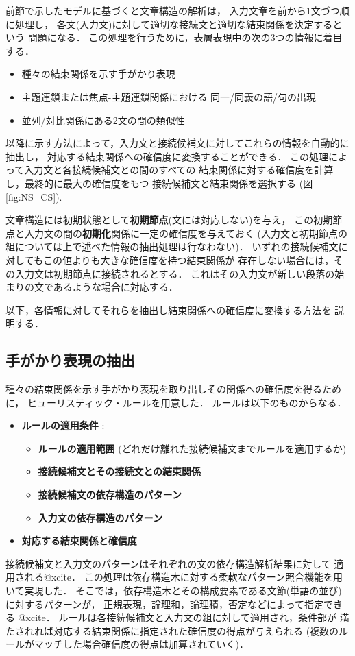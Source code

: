 前節で示したモデルに基づくと文章構造の解析は，
入力文章を前から1文づつ順に処理し，
各文(入力文)に対して適切な接続文と適切な結束関係を決定するという
問題になる．
この処理を行うために，表層表現中の次の3つの情報に着目する．
\begin{itemize}
  \item 種々の結束関係を示す手がかり表現
  \item 主題連鎖または焦点-主題連鎖関係における
同一/同義の語/句の出現
  \item 並列/対比関係にある2文の間の類似性
\end{itemize}
以降に示す方法によって，入力文と接続候補文に対してこれらの情報を自動的に抽出し，
対応する結束関係への確信度に変換することができる．
この処理によって入力文と各接続候補文との間のすべての
結束関係に対する確信度を計算し，最終的に最大の確信度をもつ
接続候補文と結束関係を選択する
(図[fig:NS_CS]). 

文章構造には初期状態として{\bf 初期節点}(文には対応しない)を与え，
この初期節点と入力文の間の{\bf 初期化}関係に一定の確信度を与えておく
(入力文と初期節点の組については上で述べた情報の抽出処理は行なわない)．
いずれの接続候補文に対してもこの値よりも大きな確信度を持つ結束関係が
存在しない場合には，その入力文は初期節点に接続されるとする．
これはその入力文が新しい段落の始まりの文であるような場合に対応する．

以下，各情報に対してそれらを抽出し結束関係への確信度に変換する方法を
説明する．

{\unitlength=1mm

}

\subsection{手がかり表現の抽出}

種々の結束関係を示す手がかり表現を取り出しその関係への確信度を得るために，
ヒューリスティック・ルールを用意した．
ルールは以下のものからなる．
\begin{itemize}
\item {\bf ルールの適用条件} :
  \begin{itemize}
  \item {\bf ルールの適用範囲} 
    (どれだけ離れた接続候補文までルールを適用するか)
  \item {\bf 接続候補文とその接続文との結束関係}

  \item {\bf 接続候補文の依存構造のパターン}
  \item {\bf 入力文の依存構造のパターン}
  \end{itemize}
\item {\bf 対応する結束関係と確信度}
\end{itemize}
接続候補文と入力文のパターンはそれぞれの文の依存構造解析結果に対して
適用される@xcite．
この処理は依存構造木に対する柔軟なパターン照合機能を用いて実現した．
そこでは，依存構造木とその構成要素である文節(単語の並び)に対するパターンが，
正規表現，論理和，論理積，否定などによって指定できる
@xcite．
ルールは各接続候補文と入力文の組に対して適用され，条件部が
満たされれば対応する結束関係に指定された確信度の得点が与えられる
(複数のルールがマッチした場合確信度の得点は加算されていく)．

